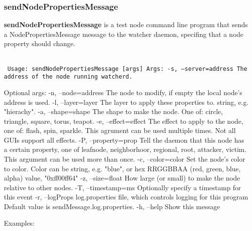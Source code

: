 \newpage
\label{sendNodePropertiesMessage}
\subsubsection{sendNodePropertiesMessage}
{\bf sendNodePropertiesMessage} is a test node command line program that sends a NodePropertiesMessage message to the watcher daemon, specifing that a node property should change. 
\\\\
{\tt
        Usage: sendNodePropertiesMessage [args]
        Args:
           -s, --server=address        The address of the node running watcherd.

        Optional args:
            -n, --node=address          The node to modify, if empty the local node's address is used.
            -l, --layer=layer           The layer to apply these properties to. string, e.g. "hierachy". 
            -a, --shape=shape           The shape to make the node. One of: circle, triangle, square, torus, teapot.
            -e, --effect=effect         The effect to apply to the node, one of: flash, spin, sparkle.
            This agrument can be used multiple times. Not all GUIs support all effects.
            -P, --property=prop         Tell the daemon that this node has a certain property, one of
            leafnode, neighborhoor, regional, root, attacker, victim. This argument can be used
            more than once.
            -c, --color=color           Set the node's color to color. Color can be string, e.g. "blue", or 
            hex RRGGBBAA (red, green, blue, alpha) value, "0xff00ff64"
            -z, --size=float            How large (or small) to make the node relative to other nodes.
            -T, --timestamp=ms          Optionally specify a timestamp for this event
            -r, --logProps              log.properties file, which controls logging for this program
                                        Default value is sendMessage.log.properties.
            -h, --help                  Show this message
}

Examples:
